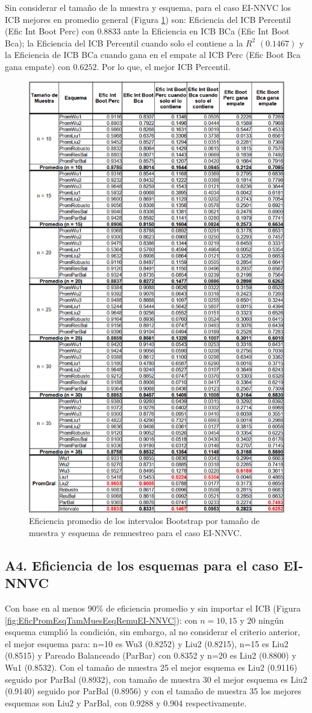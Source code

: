 Sin considerar el tamaño de la muestra y esquema, para el caso EI-NNVC los ICB mejores en promedio general (Figura \ref{fig:EficPromIntBootsTamMuestEsqRemuEI-NNVC}) son: Eficiencia del ICB Percentil (Efic Int Boot Perc) con $0.8833$ ante la Eficiencia en ICB BCa (Efic Int Boot Bca); la Eficiencia del ICB Percentil cuando solo el contiene a la $R^{2}$ $(0.1467)$ y la Eficiencia de ICB BCa cuando gana en el empate al ICB Perc (Efic Boot Bca gana empate) con $0.6252$. Por lo que, el mejor ICB Percentil.


\begin{figure}[ht] 
	\centering 
	\includegraphics[width=0.55\linewidth]{img/EI_NNVC_Efic_Boots.png} 
	\caption{Eficiencia promedio de los intervalos Bootstrap por tamaño de muestra y esquema de remuestreo para el caso EI-NNVC.} 
	\label{fig:EficPromIntBootsTamMuestEsqRemuEI-NNVC}
\end{figure}
\FloatBarrier


\subsection*{A4. Eficiencia de los esquemas para el caso EI-NNVC}


Con base en al menos 90\% de eficiencia promedio y sin importar el ICB (Figura \ref{fig:EficPromEsqTamMuesEsqRemuEI-NNVC}): con $n= 10, 15$ y $20$ ningún esquema cumplió la condición, sin embargo, al no considerar el criterio anterior, el mejor esquema para: n=10 es Wu3 (0.8252) y Liu2 (0.8215), n=15 es Liu2 (0.8515) y Pareado Balanceado (ParBar) con 0.8352 y n=20 es Liu2 (0.8800) y Wu1 (0.8532). Con el tamaño de muestra 25 el mejor esquema es Liu2 (0.9116) seguido por ParBal (0.8932), con tamaño de muestra 30 el mejor esquema es Liu2 (0.9140) seguido por ParBal (0.8956) y con el tamaño de muestra 35 los mejores esquemas son Liu2 y ParBal, con 0.9288 y 0.904 respectivamente.\\

